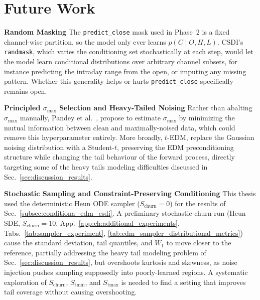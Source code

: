 \section{Future Work}
\label{sec:future_work}

\textbf{Random Masking} \quad The \texttt{predict\_close} mask used in Phase~2 is a fixed channel-wise partition, so the model only ever learns \(p(C\mid O,H,L)\). CSDI's \texttt{randmask}, which varies the conditioning set stochastically at each step, would let the model learn conditional distributions over arbitrary channel subsets, for instance predicting the intraday range from the open, or imputing any missing pattern. Whether this generality helps or hurts \texttt{predict\_close} specifically remains open.

\textbf{Principled \(\sigma_{\max}\) Selection and Heavy-Tailed Noising} \quad Rather than abalting \(\sigma_{\max}\) manually, Pandey et al.\ \cite{pandey2024heavytailed}, propose to estimate \(\sigma_{\max}\) by minimizing the mutual information between clean and maximally-noised data, which could remove this hyperparameter entirely. More broadly, \(t\)-EDM, replace the Gaussian noising distribution with a Student-\(t\), preserving the EDM preconditioning structure while changing the tail behaviour of the forward process, directly targeting some of the heavy tails modeling difficulties discussed in Sec.\ \ref{sec:discussion_results}.


\textbf{Stochastic Sampling and Constraint-Preserving Conditioning} \quad This thesis used the deterministic Heun ODE sampler (\(S_{\text{churn}}=0\)) for the results of Sec.\ \ref{subsec:conditiona_edm_csdi}. A preliminary stochastic-churn run (Heun SDE, \(S_{\text{churn}}=10\), App.\ \ref{app:ch:additional_experiments}, Tabs.\ \ref{tab:sampler_experiment}, \ref{tab:edm_sampler_distributional_metrics}) cause the standard deviation, tail quantiles, and \(W_1\) to move closer to the reference, partially addressing the heavy tail modeling problem of Sec.\ \ref{sec:discussion_results}, but overshoots kurtosis and skewness, as noise injection pushes sampling supposedly into poorly-learned regions. A systematic exploration of \(S_{\text{churn}}\), \(S_{\text{tmin}}\), and \(S_{\text{tmax}}\) is needed to find a setting that improves tail coverage without causing overshooting.

